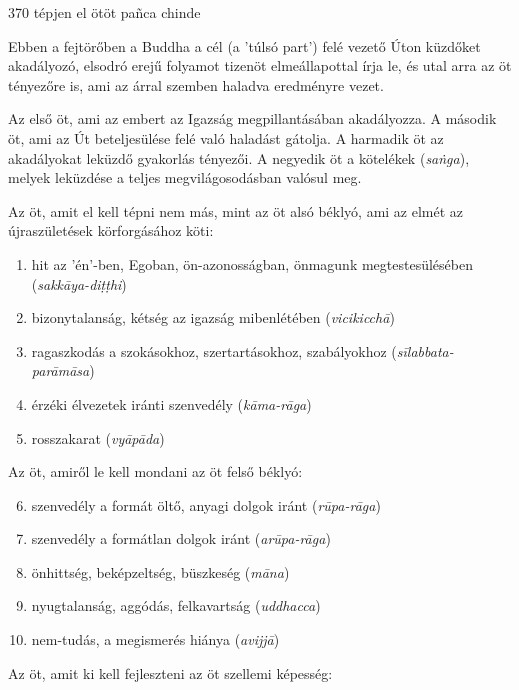 
\begin{notesdescription}

\item[{370}
{tépjen el ötöt}
{pañca chinde}] \hfill\par

Ebben a fejtörőben a Buddha a cél (a 'túlsó part') felé vezető Úton küzdőket akadályozó, elsodró erejű folyamot tizenöt elme\-állapottal írja le, és utal arra az öt tényezőre is, ami az árral szemben haladva eredményre vezet.

Az első öt, ami az embert az Igazság megpillantásában akadályozza. A második öt, ami az Út beteljesülése felé való haladást gátolja. A harmadik öt az akadályokat leküzdő gyakorlás tényezői. A negyedik öt a kötelékek (\textit{saṅga}), melyek leküzdése a teljes megvilágosodásban valósul meg.

Az öt, amit el kell tépni nem más, mint az öt alsó béklyó, ami az elmét az újraszületések körforgásához köti:

\begin{enumerate}
\item hit az 'én'-ben, Egoban, ön-azonosságban, önmagunk megtestesülésében (\textit{sakkāya-diṭṭhi})
\item bizonytalanság, kétség az igazság mibenlétében (\textit{vicikicchā})
\item ragaszkodás a szokásokhoz, szertartásokhoz, szabályokhoz (\textit{sīlabbata-parāmāsa})
\item érzéki élvezetek iránti szenvedély (\textit{kāma-rāga})
\item rosszakarat (\textit{vyāpāda})
\end{enumerate}

Az öt, amiről le kell mondani az öt felső béklyó:

\begin{enumerate}
\setcounter{enumi}{5}
\item szenvedély a formát öltő, anyagi dolgok iránt (\textit{rūpa-rāga})
\item szenvedély a formátlan dolgok iránt (\textit{arūpa-rāga})
\item önhittség, beképzeltség, büszkeség (\textit{māna})
\item nyugtalanság, aggódás, felkavartság (\textit{uddhacca})
\item nem-tudás, a megismerés hiánya (\textit{avijjā})
\end{enumerate}

Az öt, amit ki kell fejleszteni az öt szellemi képesség:


\end{notesdescription}
